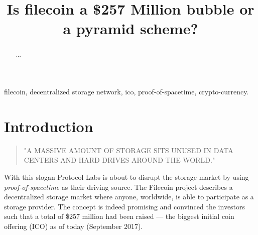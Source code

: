 \documentclass[conference]{IEEEtran}
\begin{document}
%
\title{Is filecoin a \$257 Million bubble or a pyramid scheme?}
%
%
%

\author{
\and
{}
}



\maketitle

\begin{abstract}

...

\end{abstract}

\begin{IEEEkeywords}
filecoin, decentralized storage network, ico, proof-of-spacetime, crypto-currency.
\end{IEEEkeywords}

\IEEEpeerreviewmaketitle

\section{Introduction}

\begin{quote}"A MASSIVE AMOUNT OF STORAGE SITS UNUSED IN DATA CENTERS AND HARD DRIVES AROUND THE WORLD." \cite{filecoin-io}\end{quote}
With this slogan Protocol Labs is about to disrupt the storage market by using \textit{proof-of-spacetime} as their driving source.
The Filecoin project describes a decentralized storage market where anyone, worldwide, is able to participate as a storage provider.
The concept is indeed promising and convinced the investors such that a total of \$257 million had been raised –-- the biggest initial coin offering (ICO) as of today (September 2017).
\end{document}
